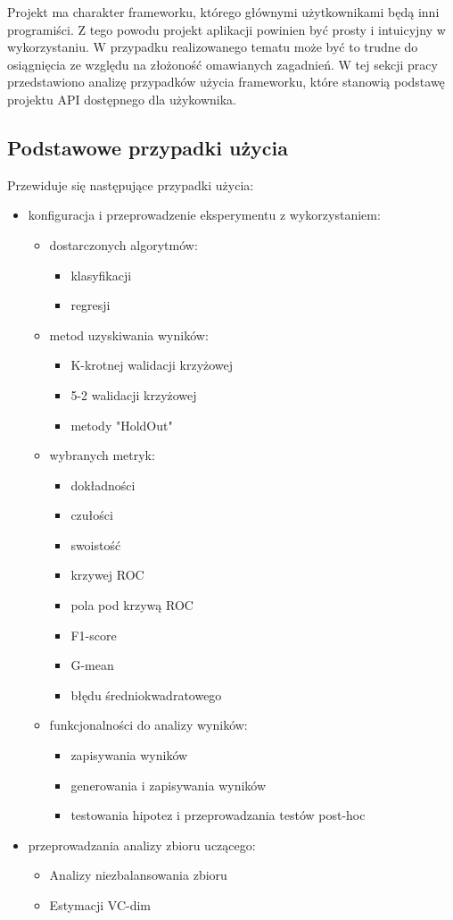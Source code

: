 \documentclass[12pt]{article}
\begin{document}
Projekt ma charakter frameworku, którego głównymi użytkownikami będą inni programiści. Z tego powodu projekt aplikacji powinien być prosty i intuicyjny w wykorzystaniu. W przypadku realizowanego tematu może być to trudne do osiągnięcia ze względu na złożoność omawianych zagadnień. W tej sekcji pracy przedstawiono analizę przypadków użycia frameworku, które stanowią podstawę projektu API dostępnego dla użykownika.

\subsection{Podstawowe przypadki użycia}

Przewiduje się następujące przypadki użycia:

\begin{itemize}
	\item konfiguracja i przeprowadzenie eksperymentu z wykorzystaniem:
	\begin{itemize}
		\item dostarczonych algorytmów:
		\begin{itemize}
			\item klasyfikacji
			\item regresji		
		\end{itemize}
		\item metod uzyskiwania wyników:
		\begin{itemize}
			\item K-krotnej walidacji krzyżowej
			\item 5-2 walidacji krzyżowej
			\item metody "HoldOut"
		\end{itemize}
		\item wybranych metryk:
		\begin{itemize}
			\item dokładności
			\item czułości
			\item swoistość
			\item krzywej ROC
			\item pola pod krzywą ROC
			\item F1-score
			\item G-mean
			\item błędu średniokwadratowego
		\end{itemize}
		\item funkcjonalności do analizy wyników:
		\begin{itemize}
			\item zapisywania wyników
			\item generowania i zapisywania wyników
			\item testowania hipotez i przeprowadzania testów post-hoc
		\end{itemize}
	\end{itemize}
	\item przeprowadzania analizy zbioru uczącego:
	\begin{itemize}
		\item Analizy niezbalansowania zbioru
		\item Estymacji VC-dim
	\end{itemize}
\end{itemize}
\end{document}

